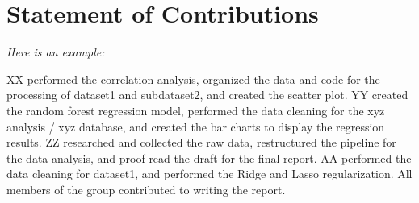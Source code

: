 \documentclass{article}
\begin{document}
\section{Statement of Contributions}

\emph{Here is an example:}

XX performed the correlation analysis, organized the data and code for the processing of dataset1 and subdataset2, and created the scatter plot. 
YY created the random forest regression model, performed the data cleaning for the xyz analysis / xyz database, and created the bar charts to display the regression results. 
ZZ researched and collected the raw data, restructured the pipeline for the data analysis, and proof-read the draft for the final report. 
AA performed the data cleaning for dataset1, and performed the Ridge and Lasso regularization. 
All members of the group contributed to writing the report.




\end{document}
